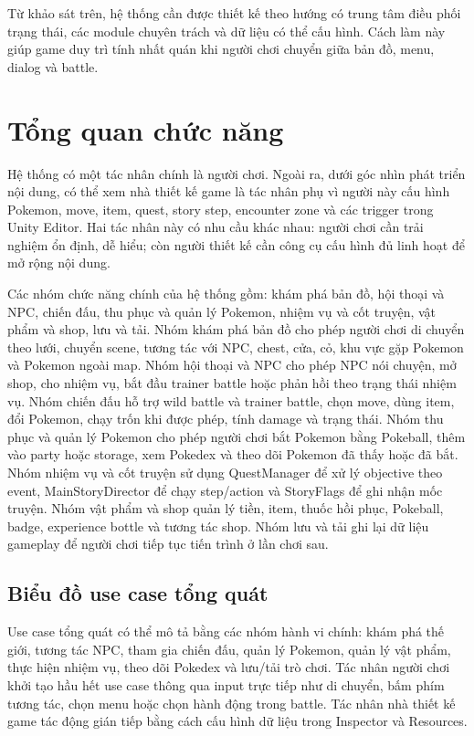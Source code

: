 Từ khảo sát trên, hệ thống cần được thiết kế theo hướng có trung tâm điều phối trạng thái, các module chuyên trách và dữ liệu có thể cấu hình. Cách làm này giúp game duy trì tính nhất quán khi người chơi chuyển giữa bản đồ, menu, dialog và battle.

\section{Tổng quan chức năng}

Hệ thống có một tác nhân chính là người chơi. Ngoài ra, dưới góc nhìn phát triển nội dung, có thể xem nhà thiết kế game là tác nhân phụ vì người này cấu hình Pokemon, move, item, quest, story step, encounter zone và các trigger trong Unity Editor. Hai tác nhân này có nhu cầu khác nhau: người chơi cần trải nghiệm ổn định, dễ hiểu; còn người thiết kế cần công cụ cấu hình đủ linh hoạt để mở rộng nội dung.

Các nhóm chức năng chính của hệ thống gồm: khám phá bản đồ, hội thoại và NPC, chiến đấu, thu phục và quản lý Pokemon, nhiệm vụ và cốt truyện, vật phẩm và shop, lưu và tải. Nhóm khám phá bản đồ cho phép người chơi di chuyển theo lưới, chuyển scene, tương tác với NPC, chest, cửa, cỏ, khu vực gặp Pokemon và Pokemon ngoài map. Nhóm hội thoại và NPC cho phép NPC nói chuyện, mở shop, cho nhiệm vụ, bắt đầu trainer battle hoặc phản hồi theo trạng thái nhiệm vụ. Nhóm chiến đấu hỗ trợ wild battle và trainer battle, chọn move, dùng item, đổi Pokemon, chạy trốn khi được phép, tính damage và trạng thái. Nhóm thu phục và quản lý Pokemon cho phép người chơi bắt Pokemon bằng Pokeball, thêm vào party hoặc storage, xem Pokedex và theo dõi Pokemon đã thấy hoặc đã bắt. Nhóm nhiệm vụ và cốt truyện sử dụng QuestManager để xử lý objective theo event, MainStoryDirector để chạy step/action và StoryFlags để ghi nhận mốc truyện. Nhóm vật phẩm và shop quản lý tiền, item, thuốc hồi phục, Pokeball, badge, experience bottle và tương tác shop. Nhóm lưu và tải ghi lại dữ liệu gameplay để người chơi tiếp tục tiến trình ở lần chơi sau.

\subsection{Biểu đồ use case tổng quát}

Use case tổng quát có thể mô tả bằng các nhóm hành vi chính: khám phá thế giới, tương tác NPC, tham gia chiến đấu, quản lý Pokemon, quản lý vật phẩm, thực hiện nhiệm vụ, theo dõi Pokedex và lưu/tải trò chơi. Tác nhân người chơi khởi tạo hầu hết use case thông qua input trực tiếp như di chuyển, bấm phím tương tác, chọn menu hoặc chọn hành động trong battle. Tác nhân nhà thiết kế game tác động gián tiếp bằng cách cấu hình dữ liệu trong Inspector và Resources.


